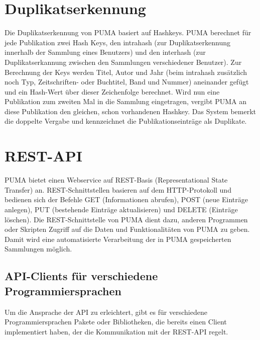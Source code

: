 \section{Duplikatserkennung} 
\label{sec:duplikat}
Die Duplikatserkennung von PUMA basiert auf Hashkeys. PUMA berechnet für jede Publikation zwei Hash Keys, den intrahash (zur Duplikatserkennung innerhalb der Sammlung eines Benutzers) und den interhash (zur Duplikatserkannung zwischen den Sammlungen verschiedener Benutzer). Zur Berechnung der Keys werden Titel, Autor und Jahr (beim intrahash zusätzlich noch Typ, Zeitschriften- oder Buchtitel, Band und Nummer) aneinander gefügt und ein Hash-Wert über dieser Zeichenfolge berechnet. Wird nun eine Publikation zum zweiten Mal in die Sammlung eingetragen, vergibt PUMA an diese Publikation den gleichen, schon vorhandenen Hashkey. Das System bemerkt die doppelte Vergabe und kennzeichnet die Publikationseinträge als Duplikate. 


\section{REST-API}
\label{sec:restApi}
PUMA bietet einen Webservice auf REST-Basis (Representational State Transfer) an. REST-Schnittstellen basieren auf dem HTTP-Protokoll und bedienen sich der Befehle GET (Informationen abrufen), POST (neue Einträge anlegen), PUT (bestehende Einträge aktualisieren) und DELETE (Einträge löschen). Die REST-Schnittstelle von PUMA dient dazu, anderen Programmen oder Skripten Zugriff auf die Daten und Funktionalitäten von PUMA zu geben. Damit wird eine automatisierte Verarbeitung der in PUMA gespeicherten Sammlungen möglich.

\subsection{API-Clients für verschiedene Programmiersprachen}
\label{subsec:apiClients}
Um die Ansprache der API zu erleichtert, gibt es für verschiedene Programmiersprachen Pakete oder Bibliotheken, die bereits einen Client implementiert haben, der die Kommunikation mit der REST-API regelt.

